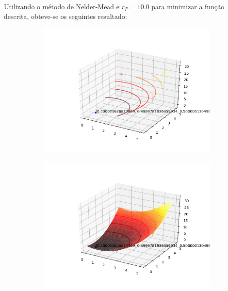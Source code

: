 \documentclass[a4paper, 12pt]{article}
\begin{document}
Utilizando o método de Nelder-Mead e $r_P = 10.0$ para minimizar a função descrita, obteve-se os seguintes resultado:


\begin{figure}[H]
\centering
\begin{subfigure}{0.3\textwidth}
  \centering
  \includegraphics[width=\linewidth]{1/E/NelderMead/contorno.png}
\end{subfigure}%
\begin{subfigure}{0.3\textwidth}
  \centering
  \includegraphics[width=\linewidth]{1/E/NelderMead/superficie.png}
\end{subfigure}
\begin{subfigure}{0.3\textwidth}

\end{subfigure}
\end{figure}
\end{document}
